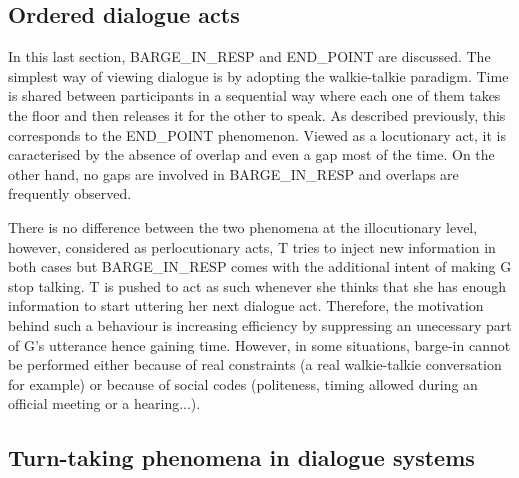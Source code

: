     \subsection{Ordered dialogue acts}

         In this last section, BARGE\_IN\_RESP and END\_POINT are discussed. The simplest way of viewing dialogue is by adopting the walkie-talkie paradigm. Time is shared between participants in a sequential way where each one of them takes the floor and then releases it for the other to speak. As described previously, this corresponds to the END\_POINT phenomenon. Viewed as a locutionary act, it is caracterised by the absence of overlap and even a gap most of the time. On the other hand, no gaps are involved in BARGE\_IN\_RESP and overlaps are frequently observed.

         There is no difference between the two phenomena at the illocutionary level, however, considered as perlocutionary acts, T tries to inject new information in both cases but BARGE\_IN\_RESP comes with the additional intent of making G stop talking. T is pushed to act as such whenever she thinks that she has enough information to start uttering her next dialogue act. Therefore, the motivation behind such a behaviour is increasing efficiency by suppressing an unecessary part of G's utterance hence gaining time. However, in some situations, barge-in cannot be performed either because of real constraints (a real walkie-talkie conversation for example) or because of social codes (politeness, timing allowed during an official meeting or a hearing...).
		
     \subsection{Turn-taking phenomena in dialogue systems}
		
